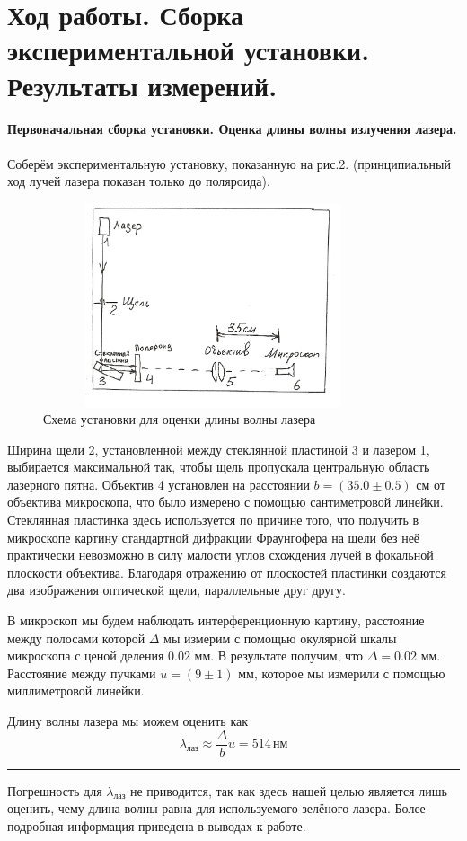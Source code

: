 \documentclass[12pt]{article}
\begin{document}
\section*{Ход работы. Сборка экспериментальной установки. Результаты измерений.}
\paragraph{Первоначальная сборка установки. Оценка длины волны излучения лазера.}
\par
	Соберём экспериментальную установку, показанную на рис.2. (принципиальный ход лучей лазера показан только до поляроида).
\begin{figure}[h!]
	\centering
	\includegraphics[width = 10cm, height = 6cm]{image3.png}
	\caption{Схема установки для оценки длины волны лазера}
\end{figure}
\par
	Ширина щели 2, установленной между стеклянной пластиной 3 и лазером 1, выбирается максимальной так, чтобы щель пропускала центральную область лазерного пятна. Объектив 4 установлен на расстоянии $b = \left(35.0 \pm 0.5\right)$ см от объектива микроскопа, что было измерено с помощью сантиметровой линейки. Стеклянная пластинка здесь используется по причине того, что получить в микроскопе картину стандартной дифракции Фраунгофера на щели без неё практически невозможно в силу малости углов схождения лучей в фокальной плоскости объектива. Благодаря отражению от плоскостей пластинки создаются два изображения оптической щели, параллельные друг другу.
\par
	В микроскоп мы будем наблюдать интерференционную картину, расстояние между полосами которой $\Delta$ мы измерим с помощью окулярной шкалы микроскопа с ценой деления $0.02$ мм. В результате получим, что $\Delta = 0.02$ мм. Расстояние между пучками $u = (9 \pm 1)$ мм, которое мы измерили с помощью миллиметровой линейки.
\par
	Длину волны лазера мы можем оценить как
\[
	\lambda _\text{лаз} \approx \frac{\Delta}{b} u = 514 \, \text{нм} 
\]
\noindent\rule{\textwidth}{1pt}
\par
	Погрешность для $\lambda_\text{лаз}$ не приводится, так как здесь нашей целью является лишь оценить, чему длина волны равна для используемого зелёного лазера. Более подробная информация приведена в выводах к работе.
\end{document}
